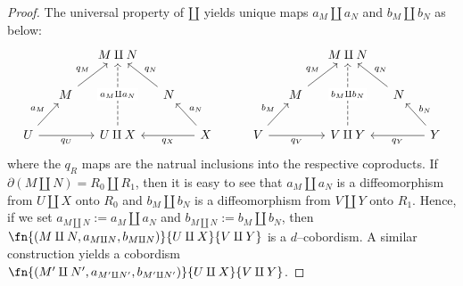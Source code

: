 \begin{proof}
The universal property of $\amalg$ yields unique maps $a_{M} \amalg a_{N}$ and
$b_{M} \amalg b_{N}$ as below:
\begin{eqnarray*}
\begin{tikzcd}[column sep=small]
& & M \amalg N & & \\
& M \arrow[ur, "q_M"] & & N \arrow{ul}[above, xshift=1.5ex]{q_N} & \\
U \arrow[ur, "a_{M}"] \arrow[rr, "q_U" below]
& & U \amalg X
    \arrow[uu, dashed, "a_{M} \amalg a_{N}" description]
& & X \arrow{ul}[right, yshift=1ex]{a_{N}} \arrow[ll, "q_X"]
\end{tikzcd} & \hspace{1.5em} &
\begin{tikzcd}[column sep=small]
& & M \amalg N & & \\
& M \arrow[ur, "q_M"] & & N \arrow{ul}[above, xshift=1.5ex]{q_N} & \\
V \arrow[ur, "b_{M}"] \arrow[rr, "q_V" below]
& & V
    \amalg Y \arrow[uu, dashed, "b_{M} \amalg b_{N}" description]
& & Y \arrow{ul}[right, yshift=1ex]{b_{N}} \arrow[ll, "q_Y"]
\end{tikzcd}
\end{eqnarray*}
where the $q_R$ maps are the natrual inclusions into the respective coproducts.
If $\partial (M \amalg N) = R_0 \amalg R_1$, then it is easy to see that
$a_{M} \amalg a_{N}$ is a diffeomorphism from $U \amalg X$ onto
$R_0$ and $b_{M} \amalg b_{N}$ is a diffeomorphism from
$V \amalg Y$ onto $R_1$. Hence, if we set
$a_{M \amalg N} := a_{M} \amalg a_{N}$ and
$b_{M \amalg N} := b_{M} \amalg b_{N}$, then
$\fn{(M \amalg N, a_{M \amalg N}, b_{M \amalg N})}
{U \amalg X}{V \amalg Y}$ is a $d$--cobordism. A similar construction yields
a cobordism
$\fn{(M' \amalg N', a_{M' \amalg N'}, b_{M' \amalg N'})}
{U \amalg X}{V \amalg Y}$.


\end{proof}
